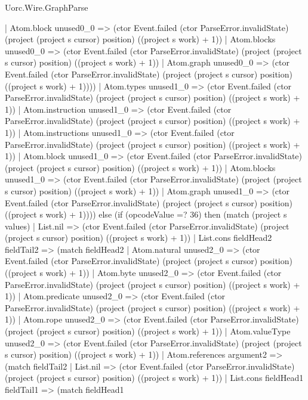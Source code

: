 \begin{lexlean}{Uorc.Wire.GraphParse}
\begin{semanticmodule}
{              | Atom.block unused0_0 => (ctor Event.failed (ctor ParseError.invalidState) (project (project s cursor) position) ((project s work) + 1))
              | Atom.blocks unused0_0 => (ctor Event.failed (ctor ParseError.invalidState) (project (project s cursor) position) ((project s work) + 1))
              | Atom.graph unused0_0 => (ctor Event.failed (ctor ParseError.invalidState) (project (project s cursor) position) ((project s work) + 1))))
          | Atom.types unused1_0 => (ctor Event.failed (ctor ParseError.invalidState) (project (project s cursor) position) ((project s work) + 1))
          | Atom.instruction unused1_0 => (ctor Event.failed (ctor ParseError.invalidState) (project (project s cursor) position) ((project s work) + 1))
          | Atom.instructions unused1_0 => (ctor Event.failed (ctor ParseError.invalidState) (project (project s cursor) position) ((project s work) + 1))
          | Atom.block unused1_0 => (ctor Event.failed (ctor ParseError.invalidState) (project (project s cursor) position) ((project s work) + 1))
          | Atom.blocks unused1_0 => (ctor Event.failed (ctor ParseError.invalidState) (project (project s cursor) position) ((project s work) + 1))
          | Atom.graph unused1_0 => (ctor Event.failed (ctor ParseError.invalidState) (project (project s cursor) position) ((project s work) + 1)))) else (if (opcodeValue =? 36) then (match (project s values)
        | List.nil => (ctor Event.failed (ctor ParseError.invalidState) (project (project s cursor) position) ((project s work) + 1))
        | List.cons fieldHead2 fieldTail2 => (match fieldHead2
          | Atom.natural unused2_0 => (ctor Event.failed (ctor ParseError.invalidState) (project (project s cursor) position) ((project s work) + 1))
          | Atom.byte unused2_0 => (ctor Event.failed (ctor ParseError.invalidState) (project (project s cursor) position) ((project s work) + 1))
          | Atom.predicate unused2_0 => (ctor Event.failed (ctor ParseError.invalidState) (project (project s cursor) position) ((project s work) + 1))
          | Atom.rope unused2_0 => (ctor Event.failed (ctor ParseError.invalidState) (project (project s cursor) position) ((project s work) + 1))
          | Atom.valueType unused2_0 => (ctor Event.failed (ctor ParseError.invalidState) (project (project s cursor) position) ((project s work) + 1))
          | Atom.references argument2 => (match fieldTail2
            | List.nil => (ctor Event.failed (ctor ParseError.invalidState) (project (project s cursor) position) ((project s work) + 1))
            | List.cons fieldHead1 fieldTail1 => (match fieldHead1
}
\end{semanticmodule}
\end{lexlean}
